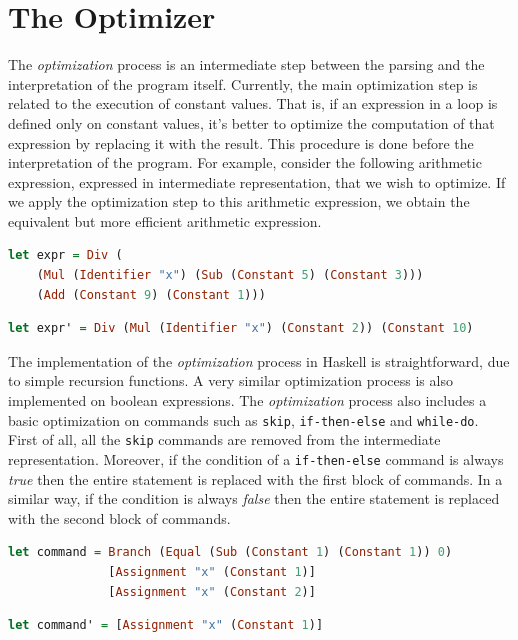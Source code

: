 \documentclass[12pt,a4paper]{article}
\begin{document}
\section*{The Optimizer}
The \textit{optimization} process is an intermediate step between the parsing and the interpretation of the program itself.
Currently, the main optimization step is related to the execution of constant values.
That is, if an expression in a loop is defined only on constant values, it's better to optimize the computation of that expression by replacing it with the result.
This procedure is done before the interpretation of the program.
For example, consider the following arithmetic expression, expressed in intermediate representation, that we wish to optimize.
If we apply the optimization step to this arithmetic expression, we obtain the equivalent but more efficient arithmetic expression.
\begin{lstlisting}[language=Haskell, style=custom-style]
let expr = Div (
    (Mul (Identifier "x") (Sub (Constant 5) (Constant 3)))
    (Add (Constant 9) (Constant 1)))
\end{lstlisting}
\begin{lstlisting}[language=Haskell, style=custom-style]
let expr' = Div (Mul (Identifier "x") (Constant 2)) (Constant 10)
\end{lstlisting}
The implementation of the \textit{optimization} process in Haskell is straightforward, due to simple recursion functions.
A very similar optimization process is also implemented on boolean expressions.
The \textit{optimization} process also includes a basic optimization on commands such as \texttt{skip}, \texttt{if-then-else} and \texttt{while-do}.
First of all, all the \texttt{skip} commands are removed from the intermediate representation.
Moreover, if the condition of a \texttt{if-then-else} command is always \textit{true} then the entire statement is replaced with the first block of commands.
In a similar way, if the condition is always \textit{false} then the entire statement is replaced with the second block of commands.
\begin{lstlisting}[language=Haskell, style=custom-style]
let command = Branch (Equal (Sub (Constant 1) (Constant 1)) 0)
              [Assignment "x" (Constant 1)]
              [Assignment "x" (Constant 2)]
\end{lstlisting}
\begin{lstlisting}[language=Haskell, style=custom-style]
let command' = [Assignment "x" (Constant 1)]
\end{lstlisting}
\end{document}
